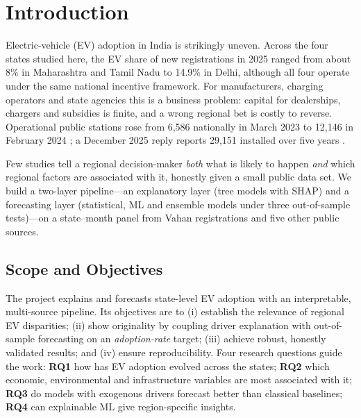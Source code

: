 \section{Introduction}
Electric-vehicle (EV) adoption in India is strikingly uneven. Across the four states studied here, the EV share of new registrations in 2025 ranged from about 8\% in Maharashtra and Tamil Nadu to 14.9\% in Delhi, although all four operate under the same national incentive framework. For manufacturers, charging operators and state agencies this is a business problem: capital for dealerships, chargers and subsidies is finite, and a wrong regional bet is costly to reverse. Operational public stations rose from 6{,}586 nationally in March 2023 \cite{pib23} to 12{,}146 in February 2024 \cite{pib24}; a December 2025 reply reports 29{,}151 installed over five years \cite{pib25}.

Few studies tell a regional decision-maker \emph{both} what is likely to happen \emph{and} which regional factors are associated with it, honestly given a small public data set. We build a two-layer pipeline---an explanatory layer (tree models with SHAP) and a forecasting layer (statistical, ML and ensemble models under three out-of-sample tests)---on a state--month panel from Vahan registrations \cite{vahan} and five other public sources.

\subsection{Scope and Objectives}
The project explains and forecasts state-level EV adoption with an interpretable, multi-source pipeline. Its objectives are to (i) establish the relevance of regional EV disparities; (ii) show originality by coupling driver explanation with out-of-sample forecasting on an \emph{adoption-rate} target; (iii) achieve robust, honestly validated results; and (iv) ensure reproducibility. Four research questions guide the work: \textbf{RQ1} how has EV adoption evolved across the states; \textbf{RQ2} which economic, environmental and infrastructure variables are most associated with it; \textbf{RQ3} do models with exogenous drivers forecast better than classical baselines; \textbf{RQ4} can explainable ML give region-specific insights.

